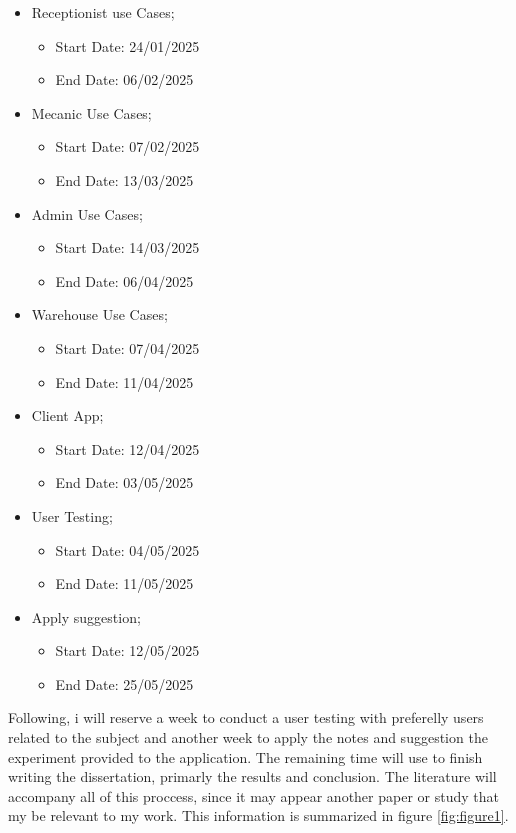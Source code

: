 \begin{itemize}
    \item Receptionist use Cases;
    \begin{itemize}
        \item Start Date: 24/01/2025 
        \item End Date: 06/02/2025 
    \end{itemize}
    \item Mecanic Use Cases;
    \begin{itemize}
      \item Start Date: 07/02/2025 
      \item End Date: 13/03/2025 
  \end{itemize}
    \item Admin Use Cases;
    \begin{itemize}
      \item Start Date: 14/03/2025 
      \item End Date: 06/04/2025 
  \end{itemize}
    \item Warehouse Use Cases;
    \begin{itemize}
      \item Start Date: 07/04/2025 
      \item End Date: 11/04/2025 
  \end{itemize}
    \item Client App;
    \begin{itemize}
      \item Start Date: 12/04/2025 
      \item End Date: 03/05/2025 
  \end{itemize}
  \item User Testing;
  \begin{itemize}
    \item Start Date: 04/05/2025 
    \item End Date: 11/05/2025 
\end{itemize}
  \item Apply suggestion;
  \begin{itemize}
    \item Start Date: 12/05/2025 
    \item End Date: 25/05/2025 
\end{itemize}
  \end{itemize}

  Following, i will reserve a week to conduct a user testing with preferelly users related to the subject and another week to apply the notes and suggestion the experiment provided to the application.
  The remaining time will use to finish writing the dissertation, primarly the results and conclusion.
  The literature will accompany all of this proccess, since it may appear another paper or study that my be relevant to my work.
  This information is summarized in figure \ref{fig:figure1}.

